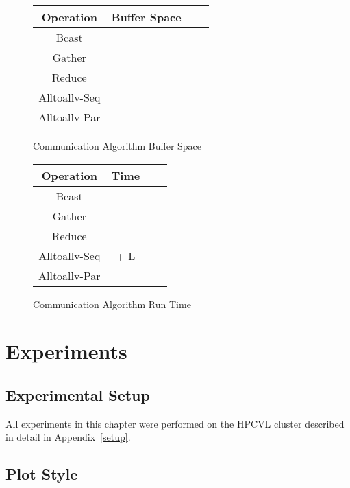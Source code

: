 \documentclass[12pt]{carletoncsthesis}
\begin{document}
\begin{figure}[h]
\begin{center}
\begin{tabular}[ht]{cccc}
Operation & Buffer Space \\ \hline
Bcast
	&  \\
Gather
	&  \\
Reduce
	&  \\
Alltoallv-Seq
	&  \\
Alltoallv-Par
	&  \\
\end{tabular}
\caption{Communication Algorithm Buffer Space}
\end{center}
\end{figure}

\begin{figure}[h]
\begin{center}
\begin{tabular}[ht]{cccc}
Operation & Time \\ \hline
Bcast
	&  \\
Gather
	&  \\
Reduce
	&  \\
Alltoallv-Seq
	&  + L \\
Alltoallv-Par
	&  \\
\end{tabular}
\caption{Communication Algorithm Run Time}
\end{center}
\end{figure}

\clearpage



\chapter{Experiments}
\thispagestyle{empty}
\label{experiments}


\section{Experimental Setup}


All experiments in this chapter were performed on the HPCVL cluster described
in detail in Appendix~\ref{setup}.

\section{Plot Style}
\end{document}
